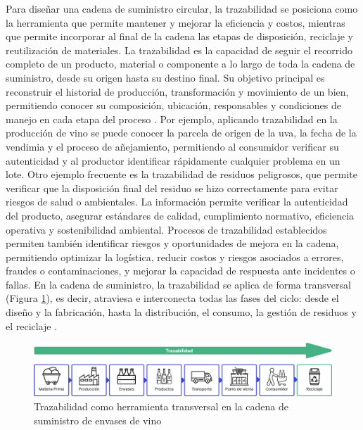 Para diseñar una cadena de suministro circular, la \gls{trazabilidad} se posiciona como la herramienta que permite mantener y mejorar la eficiencia y costos, mientras que permite incorporar al final de la cadena las etapas de disposición, reciclaje y reutilización de materiales. La trazabilidad es la capacidad de seguir el recorrido completo de un producto, material o componente a lo largo de toda la cadena de suministro, desde su origen hasta su destino final. Su objetivo principal es reconstruir el historial de producción, transformación y movimiento de un bien, permitiendo conocer su composición, ubicación, responsables y condiciones de manejo en cada etapa del proceso \cite{bartolomeo2020introduccion}. Por ejemplo, aplicando trazabilidad en la producción de vino se puede conocer la parcela de origen de la uva, la fecha de la vendimia y el proceso de añejamiento, permitiendo al consumidor verificar su autenticidad y al productor identificar rápidamente cualquier problema en un lote. Otro ejemplo frecuente es la trazabilidad de residuos peligrosos, que permite verificar que la disposición final del residuo se hizo correctamente para evitar riesgos de salud o ambientales. La información permite verificar la autenticidad del producto, asegurar estándares de calidad, cumplimiento normativo, eficiencia operativa y \gls{sostenibilidad} ambiental. Procesos de trazabilidad establecidos permiten también identificar riesgos y oportunidades de mejora en la cadena, permitiendo optimizar la logística, reducir costos y riesgos asociados a errores, fraudes o contaminaciones, y mejorar la capacidad de respuesta ante incidentes o fallas. En la cadena de suministro, la trazabilidad se aplica de forma transversal (Figura \ref{fig:supply-chain-traceability}), es decir, atraviesa e interconecta todas las fases del ciclo: desde el diseño y la fabricación, hasta la distribución, el consumo, la gestión de residuos y el reciclaje \cite{cepal2021economia}.

\begin{figure}[!tb]
    \centering
    \includegraphics[width=\textwidth]{Figures/supply-chain-traceability.png}
    \caption{Trazabilidad como herramienta transversal en la cadena de suministro de envases de vino}
    \label{fig:supply-chain-traceability}
\end{figure}

